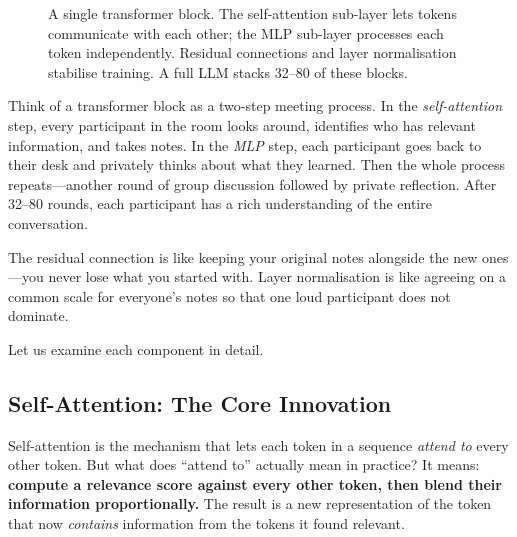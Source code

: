\begin{figure}[htbp]
\caption{A single transformer block. The self-attention sub-layer lets
  tokens communicate with each other; the MLP sub-layer processes each
  token independently. Residual connections and layer normalisation
  stabilise training. A full LLM stacks 32--80 of these blocks.}
\label{fig:transformer-block}
\end{figure}

\begin{analogy}
Think of a transformer block as a two-step meeting process. In the
\emph{self-attention} step, every participant in the room looks
around, identifies who has relevant information, and takes notes.
In the \emph{MLP} step, each participant goes back to their desk
and privately thinks about what they learned. Then the whole process
repeats---another round of group discussion followed by private
reflection. After 32--80 rounds, each participant has a rich
understanding of the entire conversation.

The residual connection is like keeping your original notes alongside
the new ones---you never lose what you started with. Layer
normalisation is like agreeing on a common scale for everyone's
notes so that one loud participant does not dominate.
\end{analogy}

Let us examine each component in detail.

\subsection{Self-Attention: The Core Innovation}
\label{sec:self-attention}

Self-attention is the mechanism that lets each token in a sequence
\emph{attend to} every other token. But what does ``attend to''
actually mean in practice? It means: \textbf{compute a relevance score
against every other token, then blend their information proportionally.}
The result is a new representation of the token that now \emph{contains}
information from the tokens it found relevant.

